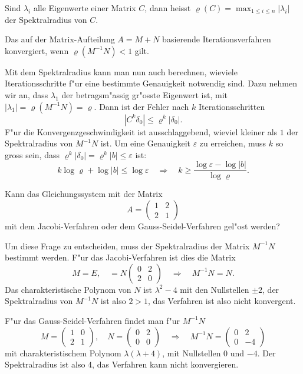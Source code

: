 \begin{definition}
Sind $\lambda_i$ alle Eigenwerte einer Matrix $C$, dann heisst
$\varrho(C)=\max_{1\le i\le n}|\lambda_i|$ der Spektralradius
von $C$.
\end{definition}

\begin{satz}
Das auf der Matrix-Aufteilung $A=M+N$ basierende Iterationsverfahren
konvergiert, wenn $\varrho(M^{-1}N)<1$ gilt.
\end{satz}

Mit dem Spektralradius kann man nun auch berechnen, wieviele Iterationsschritte
f"ur eine bestimmte Genauigkeit notwendig sind.
Dazu nehmen wir an, dass $\lambda_1$ der betragsm"assig gr"osste
Eigenwert ist, mit $|\lambda_1|=\varrho(M^{-1}N)=\varrho$.
Dann ist der Fehler nach $k$ Iterationsschritten
\[
|C^k\delta_0|\le \varrho^k|\delta_0|.
\]
F"ur die Konvergenzgeschwindigkeit ist ausschlaggebend, wieviel kleiner
als $1$ der Spektralradius von $M^{-1}N$ ist.
Um eine Genauigkeit $\varepsilon$ zu erreichen, muss $k$ so gross
sein, dass
$\varrho^k|\delta_0|=\varrho^k|b|\le \varepsilon$ ist:
\[
k\log\varrho+\log|b|\le \log\varepsilon
\quad
\Rightarrow
\quad
k\ge \frac{\log\varepsilon-\log|b|}{\log\varrho}.
\]

\begin{beispiel}
Kann das Gleichungssystem mit der Matrix 
\[
A=\begin{pmatrix}1&2\\2&1\end{pmatrix}
\]
mit dem Jacobi-Verfahren oder dem Gauss-Seidel-Verfahren gel"ost werden?

Um diese Frage zu entscheiden, muss der Spektralradius der
Matrix $M^{-1}N$ bestimmt werden.
F"ur das Jacobi-Verfahren ist dies die Matrix
\[
M=E,\quad = N\begin{pmatrix}0&2\\2&0\end{pmatrix}\quad
\Rightarrow
\quad
M^{-1}N=N.
\]
Das charakteristische Polynom von $N$ ist $\lambda^2-4$ mit den
Nullstellen $\pm2$, der Spektralradius von $M^{-1}N$ ist also $2> 1$,
das Verfahren ist also nicht konvergent.

F"ur das Gauss-Seidel-Verfahren findet man f"ur $M^{-1}N$
\[
M=\begin{pmatrix}1&0\\2&1\end{pmatrix},\quad
N=\begin{pmatrix}0&2\\0&0\end{pmatrix}\quad
\Rightarrow
\quad
M^{-1}N=\begin{pmatrix}0&2\\0&-4\end{pmatrix}
\]
mit charakteristischem Polynom $\lambda(\lambda+4)$, mit Nullstellen
$0$ und $-4$. Der Spektralradius ist also $4$, das Verfahren kann nicht
konvergieren.
\end{beispiel}


